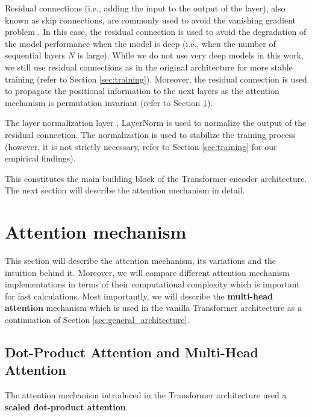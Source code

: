 \documentclass[a4paper, twoside]{report}
\theoremstyle{definition}
\numberwithin{equation}{section}
\begin{document}
Residual connections (i.e., adding the input to the output of the layer),
also known as skip connections, are commonly used to avoid the vanishing gradient problem \cite{1512.03385}.
In this case, the residual connection is used to avoid the degradation of the model performance
when the model is deep (i.e., when the number of sequential layers $N$ is large).
While we do not use very deep models in this work, we still use residual connections
as in the original architecture for more stable training (refer to Section \ref{sec:training}).
Moreover, the residual connection is used to propagate the positional information to the next layers
as the attention mechanism is permutation invariant (refer to Section \ref{sec:attention_mechanism}).

The layer normalization layer \cite{1607.06450}, $\text{LayerNorm}$ is used to normalize the output of the residual connection.
The normalization is used to stabilize the training process (however, it is not strictly necessary, refer to Section \ref{sec:training}
for our empirical findings).

This constitutes the main building block of the Transformer encoder architecture.
The next section will describe the attention mechanism in detail.

\section{Attention mechanism} \label{sec:attention_mechanism}

This section will describe the attention mechanism, its variations and the intuition behind it.
Moreover, we will compare different attention mechanism implementations in terms of
their computational complexity which is important for fast calculations.
Most importantly, we will describe the \textbf{multi-head attention} mechanism which is used in the vanilla Transformer architecture
as a continuation of Section \ref{sec:general_architecture}.

\subsection{Dot-Product Attention and Multi-Head Attention} \label{sec:dot_product_attention}

The attention mechanism introduced in the Transformer architecture \cite{1706.03762} used a \textbf{scaled dot-product attention}.
\end{document}
